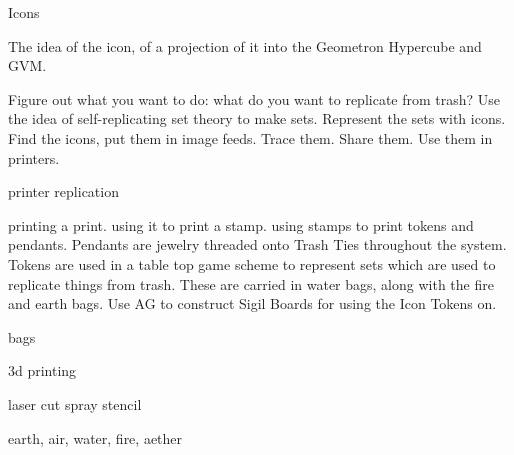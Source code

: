 Icons

The idea of the icon, of a projection of it into the Geometron Hypercube and GVM.

Figure out what you want to do: what do you want to replicate from trash?  Use the idea of self-replicating set theory to make sets.  Represent the sets with icons.  Find the icons, put them in image feeds.  Trace them.  Share them.  Use them in printers.  

 printer replication

printing a print.  using it to print a stamp.  using stamps to print tokens and pendants.  Pendants are jewelry threaded onto Trash Ties throughout the system.  Tokens are used in a table top game scheme to represent sets which are used to replicate things from trash.  These are carried in water bags, along with the fire and earth bags.  Use AG to construct Sigil Boards for using the Icon Tokens on.

 bags

3d printing

laser cut spray stencil 

 earth, air, water, fire, aether